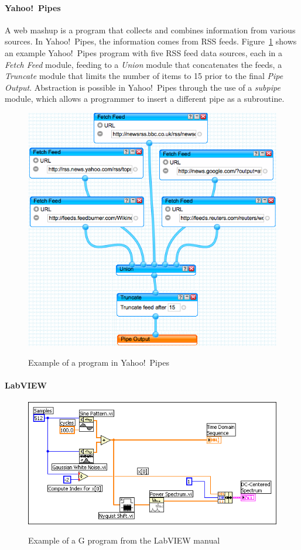 \documentclass[10pt,conference,compsocconf]{IEEEtran}
\begin{document}
\paragraph{Yahoo!\ Pipes}
A web mashup is a program that collects and combines information from various
sources. 
In  Yahoo!\ Pipes, the information comes from RSS feeds. Figure~\ref{fig:ypexample} shows an example Yahoo!\ Pipes program with five RSS feed data sources, each in a \emph{Fetch Feed} module, feeding to a \emph{Union} module that concatenates the feeds, a \emph{Truncate} module that limits the number of items to 15 prior to the final \emph{Pipe Output}. 
Abstraction is possible in Yahoo!\ Pipes through the use of a \emph{subpipe} module, which allows a programmer to insert a different pipe as a subroutine. 

\begin{figure}
\caption{Example of a program in Yahoo!\ Pipes}
\centering
\includegraphics[width=\columnwidth]{yp-1}
\label{fig:ypexample}
\end{figure}


\paragraph{LabVIEW}
\begin{figure}
\caption{Example of a G program from the LabVIEW manual}
\centering
\includegraphics[width=\columnwidth]{labview-1}
\label{fig:labviewexample}
\end{figure}
\end{document}
